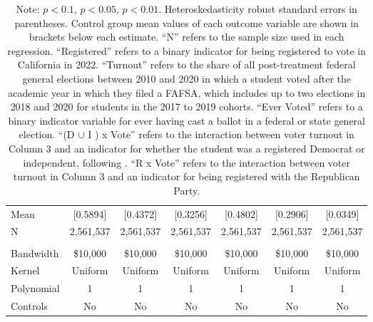 \documentclass[12pt,letterpaper,oneside]{book}
\newcommand{\basepath}{g:/My Drive/Grad School}
\newcommand{\basepath}{basepath}
\begin{document}
\begin{table}[h!]
\begin{tabular}{l*{6}{c}}
            
            Mean&[0.5894]&[0.4372]&[0.3256]&[0.4802]&[0.2906]&[0.0349]\\
            N&2,561,537    &    2,561,537      &      2,561,537     &   2,561,537 & 2,561,537     &   2,561,537 \\


            &&&&&&\\

            \hline
            Bandwidth & \$10,000       &   \$10,000        &   \$10,000        &   \$10,000       &   \$10,000        &   \$10,000        \\
            Kernel&   Uniform      &   Uniform        &   Uniform        &   Uniform       &   Uniform       &   Uniform       \\
            Polynomial&   1       &   1        &   1        &   1       &   1       &   1       \\
            Controls&   No       &   No        &   No        &   No        &   No        &   No        \\
            \hline
        \end{tabular}
        \caption*{\footnotesize Note: \sym{+} \(p<0.1\), \sym{*} \(p<0.05\), \sym{**} \(p<0.01\). Heteroskedasticity robust standard errors in parentheses. Control group mean values of each outcome variable are shown in brackets below each estimate. ``N'' refers to the sample size used in each regression. ``Registered'' refers to a binary indicator for being registered to vote in California in 2022. ``Turnout'' refers to the share of all post-treatment federal general elections between 2010 and 2020 in which a student voted after the academic year in which they filed a FAFSA, which includes up to two elections in 2018 and 2020 for students in the 2017 to 2019 cohorts. ``Ever Voted'' refers to a binary indicator variable for ever having cast a ballot in a federal or state general election. ``(D $\cup$ I ) x Vote'' refers to the interaction between voter turnout in Column 3 and an indicator for whether the student was a registered Democrat or independent, following \cite{firoozi_effect_2023}.  ``R x Vote'' refers to the interaction between voter turnout in Column 3 and an indicator for being registered with the Republican Party.}
    \end{table}


    \clearpage
\end{document}
